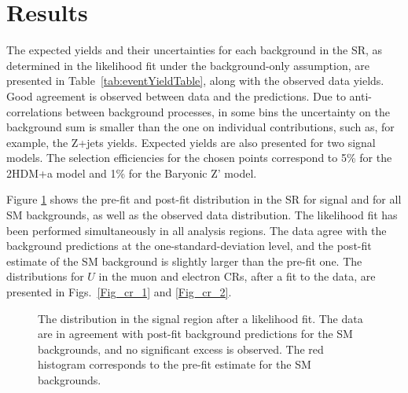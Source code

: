 \section{Results}

The expected yields and their uncertainties for each background in the SR, as determined in the likelihood fit under the background-only assumption, are presented in Table~\ref{tab:eventYieldTable}, along with the observed data yields.
Good agreement is observed between data and the predictions. Due to anti-correlations between background processes, in some bins the uncertainty on the background sum is smaller than the one on individual contributions, such as, for example, the Z+jets yields. Expected yields are also presented for two signal models. The selection efficiencies for the chosen points correspond to 5\% for the 2HDM+a model and 1\% for the Baryonic Z' model. %


Figure \ref{Fig_sr} shows the pre-fit and post-fit \MET distribution in the SR for signal and for all SM backgrounds, as well as the observed data distribution. The likelihood fit has been performed simultaneously in all analysis regions. The data agree with the background predictions at the one-standard-deviation level, and the post-fit estimate of the SM background is slightly larger than the pre-fit one. The distributions for $U$ in the muon and electron CRs, after a fit to the data, are presented in Figs.~\ref{Fig_cr_1} and \ref{Fig_cr_2}.

\begin{figure}
\centering
\caption{The \MET distribution in the signal region after a likelihood fit. The data are in agreement with post-fit background predictions for the SM backgrounds, and no significant excess is observed. The red histogram corresponds to the pre-fit estimate for the SM backgrounds.}
\label{Fig_sr}
\end{figure}

